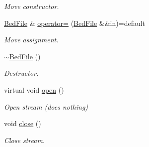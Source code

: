 \begin{DoxyCompactItemize}
\begin{DoxyCompactList}\small\item\em Move constructor. \end{DoxyCompactList}\item 
\mbox{\label{classsamp_files_1_1_bed_file_af43a7be226fcdd6898fba4b0b508395c}} 
\hyperlink{classsamp_files_1_1_bed_file}{Bed\+File} \& \hyperlink{classsamp_files_1_1_bed_file_af43a7be226fcdd6898fba4b0b508395c}{operator=} (\hyperlink{classsamp_files_1_1_bed_file}{Bed\+File} \&\&in)=default
\begin{DoxyCompactList}\small\item\em Move assignment. \end{DoxyCompactList}\item 
\mbox{\label{classsamp_files_1_1_bed_file_a8e6b512579968f51763ac693c1c4432b}} 
\hyperlink{classsamp_files_1_1_bed_file_a8e6b512579968f51763ac693c1c4432b}{$\sim$\+Bed\+File} ()
\begin{DoxyCompactList}\small\item\em Destructor. \end{DoxyCompactList}\item 
\mbox{\label{classsamp_files_1_1_bed_file_a7e0c3fcc90545d7ff69eeaec6c0ac6f3}} 
virtual void \hyperlink{classsamp_files_1_1_bed_file_a7e0c3fcc90545d7ff69eeaec6c0ac6f3}{open} ()
\begin{DoxyCompactList}\small\item\em Open stream (does nothing) \end{DoxyCompactList}\item 
\mbox{\label{classsamp_files_1_1_bed_file_acc8796c6ea50710287b0e2117c4b381e}} 
void \hyperlink{classsamp_files_1_1_bed_file_acc8796c6ea50710287b0e2117c4b381e}{close} ()
\begin{DoxyCompactList}\small\item\em Close stream. \end{DoxyCompactList}\end{DoxyCompactItemize}
